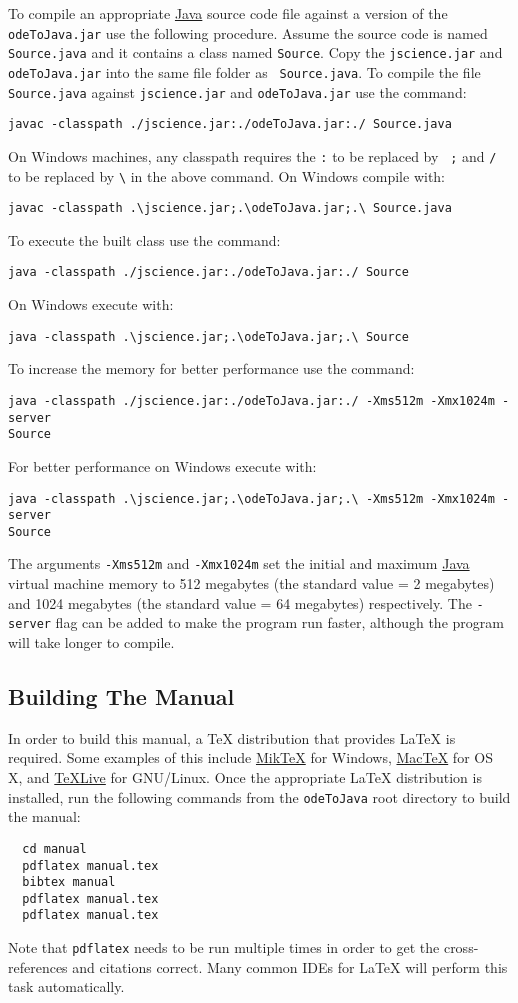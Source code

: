 \documentclass[10pt,letterpaper]{article}
\newcommand\odeToJavajar{{\tt odeToJava.jar}}
\newcommand\Java{\href{http://www.java.com/en/about/}{\sc Java}}
\newcommand\jsciencejar{{\tt jscience.jar}}
\newcommand\odj{{\tt odeToJava}}
\begin{document}
To compile an appropriate \Java{} source code file against a version of the
\odeToJavajar{} use the following procedure. Assume the source code is named
{\tt Source.java} and it contains a class named {\tt Source}. Copy the
\jsciencejar{} and \odeToJavajar{} into the same file folder as {\tt
Source.java}. To compile the file {\tt Source.java} against \jsciencejar{} and
\odeToJavajar{} use the command:
\begin{verbatim}
javac -classpath ./jscience.jar:./odeToJava.jar:./ Source.java
\end{verbatim}
On Windows machines, any classpath requires the {\tt :} to be replaced by {\tt
;} and {\tt /} to be replaced by {\tt \textbackslash} in the above command. On
Windows compile with:
\begin{verbatim}
javac -classpath .\jscience.jar;.\odeToJava.jar;.\ Source.java
\end{verbatim} 
To execute the built class use the command:
\begin{verbatim}
java -classpath ./jscience.jar:./odeToJava.jar:./ Source
\end{verbatim}
On Windows execute with:
\begin{verbatim}
java -classpath .\jscience.jar;.\odeToJava.jar;.\ Source
\end{verbatim} 
To increase the memory for better performance use the command:
\begin{verbatim}
java -classpath ./jscience.jar:./odeToJava.jar:./ -Xms512m -Xmx1024m -server
Source
\end{verbatim}
For better performance on Windows execute with:
\begin{verbatim}
java -classpath .\jscience.jar;.\odeToJava.jar;.\ -Xms512m -Xmx1024m -server
Source
\end{verbatim} 
The arguments {\tt -Xms512m} and {\tt -Xmx1024m} set the initial and maximum
\Java{} virtual machine memory to 512 megabytes (the standard value = 2
megabytes) and 1024 megabytes (the standard value = 64 megabytes) respectively.
The {\tt -server} flag can be added to make the program run faster, although the
program will take longer to compile.

\subsection{Building The Manual}

In order to build this manual, a \TeX{} distribution that provides \LaTeX{} is
required. Some examples of this include \href{http://miktex.org/}{Mik\TeX} for Windows,
\href{http://www.tug.org/mactex/2011/}{Mac\TeX} for OS X, and 
\href{http://www.tug.org/texlive/}{\TeX Live} for GNU/Linux.
Once the appropriate \LaTeX{} distribution is installed, run the following
commands from the \odj{} root directory to build the manual:
\begin{verbatim}
  cd manual
  pdflatex manual.tex
  bibtex manual
  pdflatex manual.tex
  pdflatex manual.tex
\end{verbatim}
Note that {\tt pdflatex} needs to be run multiple times in order to get the
cross-references and citations correct. Many common IDEs for \LaTeX{} will
perform this task automatically.
\end{document}
